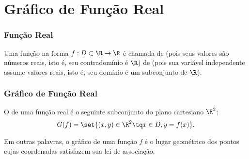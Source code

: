 \documentclass[brazil, notheorems, 10pt]{beamer}
\begin{document}

\section{Gráfico de Função Real}
\begin{frame} \frametitle{Função Real}
\begin{Def}
Uma função na forma $f : D \subset \R \to \R$ é chamada de
 (pois seus valores são números reais, isto é, seu
contradomínio é $\R$) de  (pois sua variável
independente assume valores reais, isto é, seu domínio é um
subconjunto de $\R$).
\end{Def}



\end{frame}


\begin{frame}
\frametitle{Gráfico de Função Real} %

\begin{Def}
O  de uma função real é o seguinte subconjunto do plano
cartesiano $\R^2$: $$G(f) = \set{(x,y) \in \R^2 \tq x \in D , y =
f(x)}.$$
\end{Def}
Em outras palavras, o gráfico de uma função $f$ é o lugar geométrico
dos pontos cujas coordenadas satisfazem sua lei de associação.

\end{frame}
\end{document}
